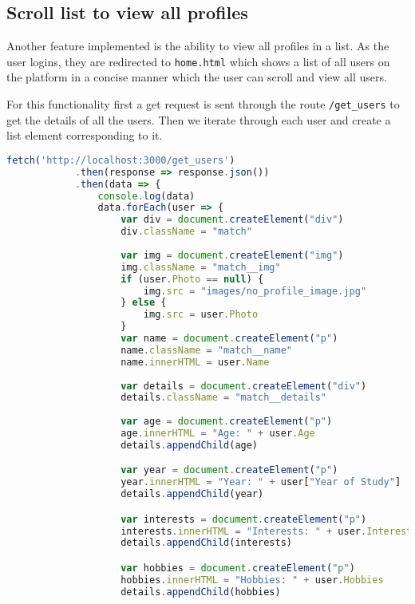 \documentclass{article}
\begin{document}
\subsection{Scroll list to view all profiles}
Another feature implemented is the ability to view all profiles in a list. As the user logins, they are redirected to \texttt{home.html} which shows a list of all users on the platform in a concise manner which the user can scroll and view all users.

For this functionality first a get request is sent through the route \texttt{/get\_users} to get the details of all the users. Then we iterate through each user and create a list element corresponding to it.

\begin{lstlisting}[language=javascript]
    fetch('http://localhost:3000/get_users')
            .then(response => response.json())
            .then(data => {
                console.log(data)
                data.forEach(user => {
                    var div = document.createElement("div")
                    div.className = "match"
                    
                    var img = document.createElement("img")
                    img.className = "match__img"
                    if (user.Photo == null) {
                        img.src = "images/no_profile_image.jpg"
                    } else {
                        img.src = user.Photo
                    }
                    var name = document.createElement("p")
                    name.className = "match__name"
                    name.innerHTML = user.Name
                    
                    var details = document.createElement("div")
                    details.className = "match__details"
                   
                    var age = document.createElement("p")
                    age.innerHTML = "Age: " + user.Age
                    details.appendChild(age)

                    var year = document.createElement("p")
                    year.innerHTML = "Year: " + user["Year of Study"]
                    details.appendChild(year)

                    var interests = document.createElement("p")
                    interests.innerHTML = "Interests: " + user.Interests
                    details.appendChild(interests)

                    var hobbies = document.createElement("p")
                    hobbies.innerHTML = "Hobbies: " + user.Hobbies
                    details.appendChild(hobbies)


\end{lstlisting}
\end{document}
